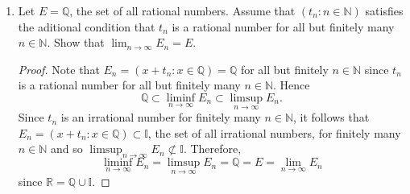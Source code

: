 \documentclass[12pt]{article}
\newcommand{\N}{\mathbb{N}}
\newcommand{\R}{\mathbb{R}}
\newcommand{\Q}{\mathbb{Q}}
\newenvironment{problem}[2][Problem]{\begin{trivlist}
		\item[\hskip \labelsep {\bfseries #1}\hskip \labelsep {\bfseries #2.}]}{\end{trivlist}}
\begin{document}
\begin{problem}{1.5}
\begin{enumerate}[label=\textbf{(\alph*)}]
	\item Let $E=\Q$, the set of all rational numbers. Assume that $\left(t_{n}:n \in \N\right)$ satisfies the aditional condition that $t_{n}$ is a rational number for all but finitely many $n\in \N$. Show that $\lim_{n \to \infty} E_{n} = E$. 
	\begin{proof}
		Note that $E_{n} = \left(x + t_{n} : x\in \Q \right) = \Q$ for all but finitely $n\in \N$ since $t_{n}$ is a rational number for all but finitely many $n\in \N$. Hence
		\begin{equation*}
			\Q \subset \liminf_{n \to \infty} E_{n} \subset \limsup_{n\to \infty} E_{n}.
		\end{equation*} 
		Since $t_{n}$ is an irrational number for finitely many $n\in \N$, it follows that $E_{n} = \left(x + t_{n} : x\in \Q \right) \subset \mathbb{I}$, the set of all irrational numbers, for finitely many $n\in \N$ and so $ \limsup_{n\to \infty} E_{n} \not\subset \mathbb{I}$. Therefore,
		\begin{equation*}
			 \liminf_{n \to \infty} E_{n} = \limsup_{n\to \infty} E_{n} = \Q = E = \lim_{n \to \infty} E_{n}
		\end{equation*}
	since $\R = \Q \cup \mathbb{I}$.
	\end{proof}


\end{enumerate}
\end{problem}
\end{document}
